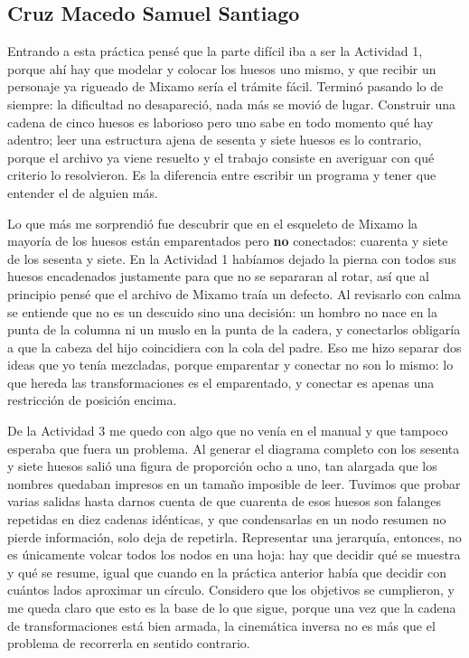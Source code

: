 \subsection{Cruz Macedo Samuel Santiago}
Entrando a esta práctica pensé que la parte difícil iba a ser la Actividad 1, porque ahí hay que modelar y colocar los huesos uno mismo, y que recibir un personaje ya rigueado de Mixamo sería el trámite fácil. Terminó pasando lo de siempre: la dificultad no desapareció, nada más se movió de lugar. Construir una cadena de cinco huesos es laborioso pero uno sabe en todo momento qué hay adentro; leer una estructura ajena de sesenta y siete huesos es lo contrario, porque el archivo ya viene resuelto y el trabajo consiste en averiguar con qué criterio lo resolvieron. Es la diferencia entre escribir un programa y tener que entender el de alguien más.

Lo que más me sorprendió fue descubrir que en el esqueleto de Mixamo la mayoría de los huesos están emparentados pero \textbf{no} conectados: cuarenta y siete de los sesenta y siete. En la Actividad 1 habíamos dejado la pierna con todos sus huesos encadenados justamente para que no se separaran al rotar, así que al principio pensé que el archivo de Mixamo traía un defecto. Al revisarlo con calma se entiende que no es un descuido sino una decisión: un hombro no nace en la punta de la columna ni un muslo en la punta de la cadera, y conectarlos obligaría a que la cabeza del hijo coincidiera con la cola del padre. Eso me hizo separar dos ideas que yo tenía mezcladas, porque emparentar y conectar no son lo mismo: lo que hereda las transformaciones es el emparentado, y conectar es apenas una restricción de posición encima.

De la Actividad 3 me quedo con algo que no venía en el manual y que tampoco esperaba que fuera un problema. Al generar el diagrama completo con los sesenta y siete huesos salió una figura de proporción ocho a uno, tan alargada que los nombres quedaban impresos en un tamaño imposible de leer. Tuvimos que probar varias salidas hasta darnos cuenta de que cuarenta de esos huesos son falanges repetidas en diez cadenas idénticas, y que condensarlas en un nodo resumen no pierde información, solo deja de repetirla. Representar una jerarquía, entonces, no es únicamente volcar todos los nodos en una hoja: hay que decidir qué se muestra y qué se resume, igual que cuando en la práctica anterior había que decidir con cuántos lados aproximar un círculo. Considero que los objetivos se cumplieron, y me queda claro que esto es la base de lo que sigue, porque una vez que la cadena de transformaciones está bien armada, la cinemática inversa no es más que el problema de recorrerla en sentido contrario.

